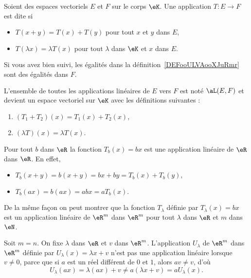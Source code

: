 \begin{definition}      \label{DEFooULVAooXJuRmr}
    Soient des espaces vectoriels \( E \) et \( F\) sur le corps \( \eK\). Une application \( T\colon E\to F\) est dite  si
    \begin{itemize}
        \item $T(x+y)=T(x)+T(y)$ pour tout $x$ et $y$ dans \( E\),
        \item $T(\lambda x)=\lambda T(x)$ pour tout $\lambda$ dans $\eK$ et \( x\) dans \( E\).
    \end{itemize}
\end{definition}
Si vous avez bien suivi, les égalités dans la définition~\ref{DEFooULVAooXJuRmr} sont des égalités dans \( F\).

\begin{lemmaDef} \label{DefDQRooVGbzSm}
    L'ensemble de toutes les applications linéaires de \( E\) vers \( F\) est noté \( \aL(E,F)\) et devient un espace vectoriel sur \( \eK\) avec les définitions suivantes :
    \begin{enumerate}
        \item
            \( (T_1+T_2)(x)=T_1(x)+T_2(x)\),
        \item
            \( (\lambda T)(x)=\lambda T(x)\).
    \end{enumerate}
\end{lemmaDef}

\begin{example}
Pour tout $b$ dans $\eR$ la fonction $T_b(x)= bx$ est une application linéaire de $\eR$ dans $\eR$. En effet,
\begin{itemize}
\item  $T_b(x+y)= b(x+y)= bx + by = T_b(x)+T_b(y)$,
\item $T_b(ax)=b(ax)= abx = a T_b(x)$.
\end{itemize}
De la même façon on peut montrer que la fonction $T_{\lambda}$ définie par $T_{\lambda}(x)=bx$ est un application linéaire de $\eR^m$ dans $\eR^m$ pour tout $\lambda$ dans $\eR$ et $m$ dans $\eN$.
\end{example}

\begin{example}\label{ex_affine}
	Soit $m=n$. On fixe $\lambda$ dans $\eR$ et $v$ dans $\eR^m$. L'application $U_{\lambda}$ de $\eR^m$ dans $\eR^m$ définie par $U_{\lambda}(x)=\lambda x+v$ n'est pas une application linéaire lorsque \( v \neq 0 \), parce que si \( a \) est un réel différent de \(0 \) et \( 1 \), alors \( av \neq v \), d'où
\[
U_{\lambda}(ax)=\lambda(ax)+v\neq a(\lambda x+v) =a U_{\lambda}(x).
\]
\end{example}

